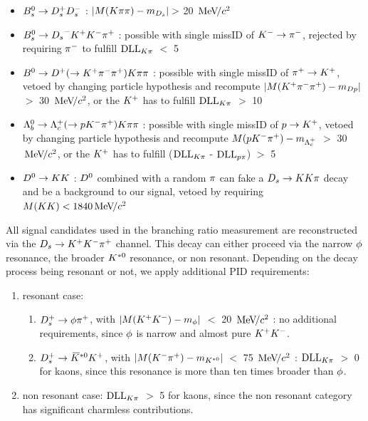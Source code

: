 \begin{itemize}

\item $\Bs\to\Dsp\Dsm$ : $|M(\kaon\pion\pion) - m_{\Ds}| >$ 20 $\mevcc$ 

\item $\Bs\to\Ds^{-}\Kp\Km\pip$ : possible with single missID of $\Km\rightarrow\pim$, rejected by requiring $\pim$ to fulfill $\dllkpi$ $<$ 5 

\item $\Bz\to\Dp(\to\Kp\pim\pip)\kaon\pion\pion$ : possible with single missID of $\pip\rightarrow\Kp$, vetoed by changing particle hypothesis and recompute $|M(\Kp\pim\pip) - m_{Dp}|$ $>$ 30 $\mevcc$, 
or the $\Kp$ has to fulfill $\dllkpi$ $>$ 10

\item $\Lb\to\Lc(\to\proton\Km\pip)\kaon\pion\pion$ : possible with single missID of $\proton\rightarrow\Kp$, vetoed by changing particle hypothesis and recompute $M(\proton\Km\pip) - m_{\Lc}$ $>$ 30 $\mevcc$, 
or the $\Kp$ has to fulfill ($\dllkpi$ - $\dllppi$) $>$ 5  

\item $\Dz\to\kaon\kaon$ : $\Dz$ combined with a random $\pion$ can fake a $\Ds\to\kaon\kaon\pion$ decay and be a background to our signal, vetoed by requiring $M(\kaon\kaon) < 1840 \mevcc$  

\end{itemize} 


All signal candidates used in the branching ratio measurement are reconstructed via the $\Ds\to\Kp\Km\pip$ channel. This decay can either proceed via the narrow $\phiz$ resonance, the broader $\Kstarz$ resonance, or non resonant.
Depending on the decay process being resonant or not, we apply additional PID requirements:

\begin{enumerate}

\item resonant case: 
\begin{enumerate}
\item $\Dsp\to\phiz\pip$, with $|M(\Kp\Km) - m_{\phiz}|$ $<$ 20 $\mevcc$ : no additional requirements, since $\phiz$ is narrow and almost pure $\Kp\Km$. 
\item $\Dsp\to\Kstarzb\Kp$, with  $|M(\Km\pip) -m_{\Kstarz}|$ $<$ 75 $\mevcc$ :  $\dllkpi$ $>$ 0 for kaons, since this resonance is more than ten times broader than $\phiz$. 
\end{enumerate}

\item non resonant case: $\dllkpi$ $>$ 5 for kaons, since the non resonant category has significant charmless contributions.

\end{enumerate}

